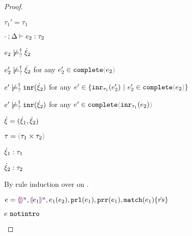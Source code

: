 \begin{proof}
\begin{byCases}
\begin{byCases}
\begin{byCases}
          \begin{pfsteps*}
          \item $\tau_1'=\tau_1$ 
          \item $\cdot \mathbin{;} \Delta \vdash e_2 : \tau_2$  
          \item $e_2 \not\models_{?}^{\dag} \dot{\xi}_2$  
          \item $e_2' \not\models_{?}^{\dag} \dot{\xi}_2$ for any $e_2' \in \expcomplete{e_2}$  
          \item $e' \not\models_{?}^{\dag} \mathtt{inr}(\dot{\xi}_2)$ for any $e' \in \{\hinr{\tau_1}{e_2'} ~\vert~ e_2' \in \expcomplete{e_2}\}$  
          \item $e' \not\models_{?}^{\dag} \mathtt{inr}(\dot{\xi}_2)$ for any $e' \in \expcomplete{\hinr{\tau_1}{e_2}}$ 
          \end{pfsteps*} 
        \end{byCases}
      \end{byCases} 
    \item[\text{(\ref{rule:CTPair})}]
    \begin{pfsteps*}
    \item $\dot{\xi}=(\dot{\xi}_1 , \dot{\xi}_2)$ 
    \item $\tau=\tprod{\tau_1}{\tau_2}$ 
    \item $\dot{\xi}_1 : \tau_1$  
    \item $\dot{\xi}_2 : \tau_2$  
    \end{pfsteps*} 
    By rule induction over  on .
    \begin{byCases}
      \item[\text{(\ref{rule:IEHole}), (\ref{rule:IHole}), (\ref{rule:IAp}), (\ref{rule:IPrl}), (\ref{rule:IPrr}), (\ref{rule:IMatch})}]
      \begin{pfsteps*}
      \item $e=\textcolor{violet}{\llparenthesis}\textcolor{violet}{\rrparenthesis}^{u}, \textcolor{violet}{\llparenthesis} e_1\textcolor{violet}{\rrparenthesis}^{u}, e_1(e_2), \mathtt{prl}(e_1), \mathtt{prr}(e_1), \mathtt{match}(e_1) \{\hat{rs}\}$ 
      \item $e ~\mathtt{notintro}$  

\end{pfsteps*}
\end{byCases}
\end{byCases}
\end{proof}
